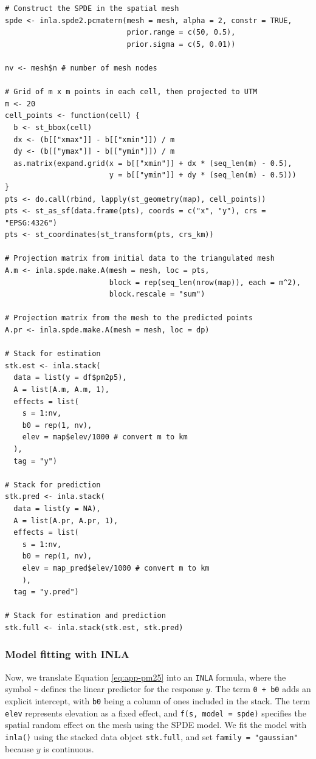 \begin{verbatim}
# Construct the SPDE in the spatial mesh
spde <- inla.spde2.pcmatern(mesh = mesh, alpha = 2, constr = TRUE,
                            prior.range = c(50, 0.5),
                            prior.sigma = c(5, 0.01))

nv <- mesh$n # number of mesh nodes

# Grid of m x m points in each cell, then projected to UTM
m <- 20
cell_points <- function(cell) {
  b <- st_bbox(cell)
  dx <- (b[["xmax"]] - b[["xmin"]]) / m
  dy <- (b[["ymax"]] - b[["ymin"]]) / m
  as.matrix(expand.grid(x = b[["xmin"]] + dx * (seq_len(m) - 0.5),
                        y = b[["ymin"]] + dy * (seq_len(m) - 0.5)))
}
pts <- do.call(rbind, lapply(st_geometry(map), cell_points))
pts <- st_as_sf(data.frame(pts), coords = c("x", "y"), crs = "EPSG:4326")
pts <- st_coordinates(st_transform(pts, crs_km))

# Projection matrix from initial data to the triangulated mesh
A.m <- inla.spde.make.A(mesh = mesh, loc = pts,
                        block = rep(seq_len(nrow(map)), each = m^2),
                        block.rescale = "sum")

# Projection matrix from the mesh to the predicted points
A.pr <- inla.spde.make.A(mesh = mesh, loc = dp)

# Stack for estimation
stk.est <- inla.stack(
  data = list(y = df$pm2p5),
  A = list(A.m, A.m, 1),
  effects = list(
    s = 1:nv,
    b0 = rep(1, nv),
    elev = map$elev/1000 # convert m to km
  ),
  tag = "y")

# Stack for prediction
stk.pred <- inla.stack(
  data = list(y = NA),
  A = list(A.pr, A.pr, 1),
  effects = list(
    s = 1:nv,
    b0 = rep(1, nv),
    elev = map_pred$elev/1000 # convert m to km
    ),
  tag = "y.pred")

# Stack for estimation and prediction
stk.full <- inla.stack(stk.est, stk.pred)
\end{verbatim}

\subsubsection{Model fitting with INLA}\label{model-fitting-with-inla}

Now, we translate Equation \eqref{eq:app-pm25} into an \texttt{INLA} formula, where the symbol \texttt{\textasciitilde{}} defines the linear predictor for the response \(y\). The term \texttt{0\ +\ b0} adds an explicit intercept, with \texttt{b0} being a column of ones included in the stack. The term \texttt{elev} represents elevation as a fixed effect, and \texttt{f(s,\ model\ =\ spde)} specifies the spatial random effect on the mesh using the SPDE model. We fit the model with \texttt{inla()} using the stacked data object \texttt{stk.full}, and set \texttt{family\ =\ "gaussian"} because \(y\) is continuous.

